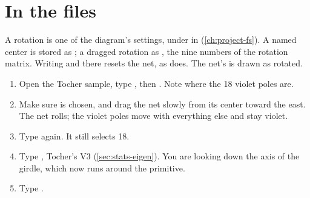 \section{In the files}

A rotation is one of the diagram's settings, under  in 
(\cref{ch:project-fs}). A named center is stored as ; a dragged rotation as
, the nine numbers of the rotation matrix. Writing  and
 there resets the net, as  does. The net's  is drawn
as rotated.

\begin{tryit}
\begin{enumerate}
\item Open the Tocher sample, type , then . Note where the
18 violet poles are.
\item Make sure  is chosen, and drag the net slowly from its center toward the east. The net
rolls; the violet poles move with everything else and stay violet.
\item Type  again. It still selects 18.
\item Type , Tocher's V3 (\cref{sec:stats-eigen}). You are looking down the axis of
the girdle, which now runs around the primitive.
\item Type .
\end{enumerate}
\end{tryit}
